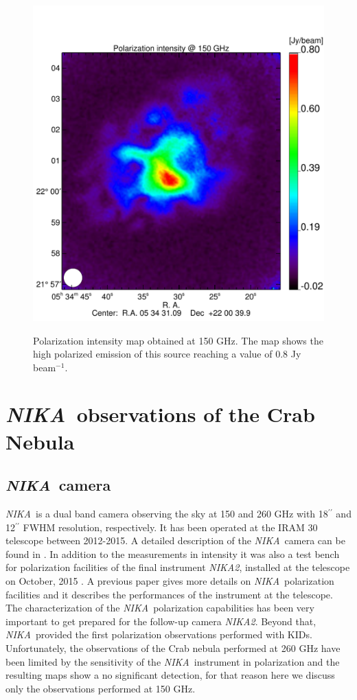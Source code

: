 \documentclass[twocolumn,traditabstract]{aa}
\def\NIKA{\textit{NIKA}}
\def\NIKAd{\textit{NIKA2}}
\begin{document}
 \begin{figure}
  \centering
     	   {\includegraphics[width=0.75\linewidth,keepaspectratio]{figures/Crab_ipol2_2mm.pdf}}
\caption{Polarization intensity map obtained at 150 GHz. The map shows the high polarized emission of this source reaching a value of 0.8 Jy beam$^{-1}$.}
\label{crab_ipol_maps}		
  \end{figure}
 

\section{\NIKA\ observations of the Crab Nebula}\label{sec:NIKA observations}
\subsection{\NIKA\ camera}\label{sec:nika camera}
\NIKA\ is a dual band camera observing the sky at 150 and 260 GHz with 18$^{\prime\prime}$ and 12$^{\prime\prime}$ FWHM resolution, respectively. It has been operated at the IRAM 30 telescope between 2012-2015. A detailed description of the \NIKA\ camera can be found in \citet{monfardini2010, monfardini2011, catalano2014}. In addition to the measurements in intensity it was also a test bench for polarization facilities of the final instrument \NIKAd, installed at the telescope on October, 2015 \citep{calvo2016,2016arXiv160508628C}.
 A previous paper \citep{ritacco2017} gives more details on \NIKA\ polarization facilities and it describes the performances of the instrument at the telescope. The characterization of the \NIKA\ polarization capabilities has been very important to get prepared for the follow-up camera \NIKAd. Beyond that, \NIKA\ provided the first polarization observations performed with KIDs. Unfortunately, the observations of the Crab nebula performed at 260 GHz have been limited by the sensitivity of the \NIKA\ instrument in polarization and the resulting maps show a no significant detection, for that reason here we discuss only the observations performed at 150 GHz. 
\end{document}
